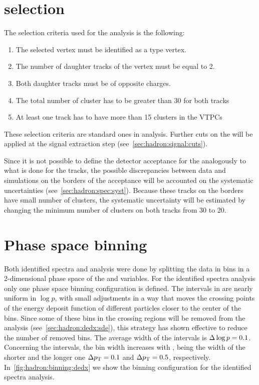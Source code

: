 

\section{\vzero selection}
\label{sec:hadron:vzeroselection}


The \vzero selection criteria used for the \vzero analysis
is the following:
\begin{enumerate}[label=(\roman*)]
\item The selected vertex must be identified as a \vzero type vertex.
\item The number of daughter tracks of the vertex must be equal to 2.
\item Both daughter tracks must be of opposite charges.
\item The total number of cluster has to be greater than 30 for both tracks
\item At least one track has to have more than 15 clusters in the VTPCs
\end{enumerate}
These selection criteria are standard ones in \NASixtyOne analysis.
Further cuts on the \vzeros will be applied at the signal extraction
step (see~\cref{sec:hadron:signal:cuts}).

Since it is not possible to define the detector acceptance for
the \vzeros analogously to what is done for the tracks, the possible
discrepancies between data and simulations on the borders of the acceptance
will be accounted on the systematic uncertainties (see~\cref{sec:hadron:spec:syst}).
Because these tracks on the borders have small number of clusters,
the systematic uncertainty will be estimated by changing the minimum number
of clusters on both tracks from 30 to 20. 


\section{Phase space binning}


Both identified spectra and \vzero analysis were done
by splitting the data in bins in a 2-dimensional
phase space of the \pp and \pT variables. For the
identified spectra analysis only one phase space
binning configuration is defined. The intervals in \pp
are nearly uniform in $\log p$, with small adjustments in a way
that moves the crossing points of the energy deposit function
of different particles closer to the center of the bins.
Since some of these bins in the crossing regions
will be removed from the analysis (see~\cref{sec:hadron:dedx:sde}),
this strategy has shown effective to reduce the number of
removed bins. The average width of the \pp intervals is
$\Delta\log p=0.1$. Concerning the \pT intervals, the bin width
increases with \pT, being the width of the shorter and the longer one
$\Delta p_\text{T}=0.1$ and  $\Delta p_\text{T}=0.5$, respectively.  
In~\cref{fig:hadron:binning:dedx} we show the binning configuration
for the identified spectra analysis.


